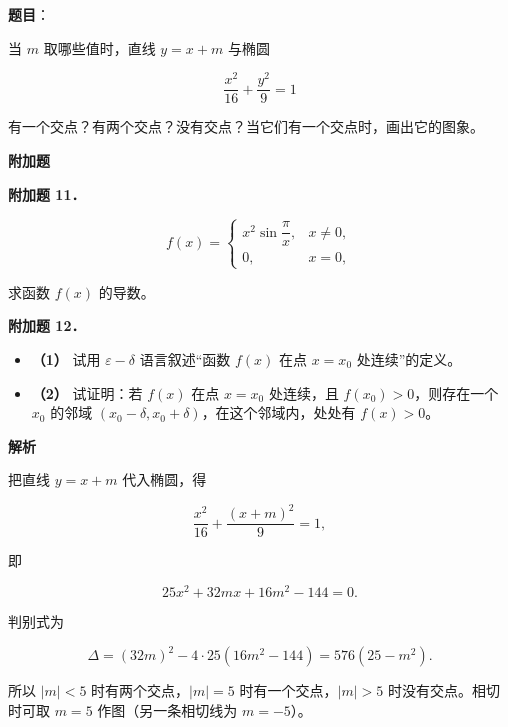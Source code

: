 \begin{answer}

\textbf{题目}：

当 $m$ 取哪些值时，直线 $y=x+m$ 与椭圆

\nopagebreak[4]
\[
\frac{x^2}{16}+\frac{y^2}{9}=1
\]

有一个交点？有两个交点？没有交点？当它们有一个交点时，画出它的图象。

\begin{gktip}
\Needspace{0.25\textheight}
\textbf{附加题}
\end{gktip}

\textbf{附加题 11．}

\nopagebreak[4]
\[
f(x)=
\begin{cases}
x^2\sin\dfrac\pi x,&x\ne0,\\
0,&x=0,
\end{cases}
\]

求函数 $f(x)$ 的导数。

\textbf{附加题 12．}

\begin{itemize}
\item \textbf{（1）} 试用 $\varepsilon-\delta$ 语言叙述“函数 $f(x)$ 在点 $x=x_0$ 处连续”的定义。
\end{itemize}

\begin{itemize}
\item \textbf{（2）} 试证明：若 $f(x)$ 在点 $x=x_0$ 处连续，且 $f(x_0)>0$，则存在一个 $x_0$ 的邻域 $(x_0-\delta,x_0+\delta)$，在这个邻域内，处处有 $f(x)>0$。
\end{itemize}

\textbf{解析}

把直线 $y=x+m$ 代入椭圆，得

\nopagebreak[4]
\[
\frac{x^2}{16}+\frac{(x+m)^2}{9}=1,
\]

即

\nopagebreak[4]
\[
25x^2+32mx+16m^2-144=0.
\]

判别式为

\nopagebreak[4]
\[
\Delta=(32m)^2-4\cdot25(16m^2-144)=576(25-m^2).
\]

所以 $|m|<5$ 时有两个交点，$|m|=5$ 时有一个交点，$|m|>5$ 时没有交点。相切时可取 $m=5$ 作图（另一条相切线为 $m=-5$）。
\nopagebreak[4]
\begin{center}\end{center}
\nopagebreak[4]


\end{answer}
